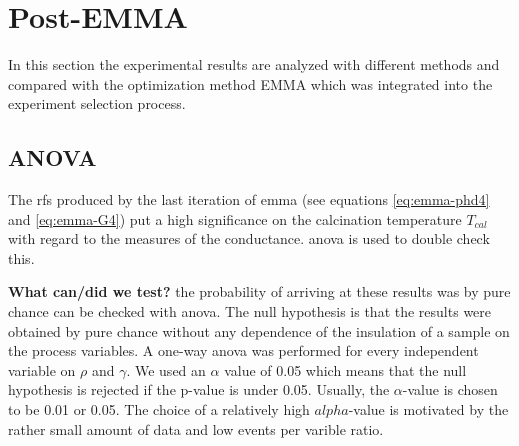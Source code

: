 \section{Post-EMMA}
\label{sec:res-post-emma}
In this section the experimental results are analyzed with different methods and compared 
with the optimization method EMMA which was integrated into the experiment selection process. 
\subsection{ANOVA}\label{sec:res-anova}
The \gls{rf}s produced by the last iteration of \gls{emma} (see equations \ref{eq:emma-phd4} and \ref{eq:emma-G4}) put a high significance
on the calcination temperature $T_{cal}$ with regard to the 
measures of the conductance. 
\Gls{anova} is used to double check this. 

\textbf{What can/did we test?}
the probability of arriving at these results was by pure chance can be checked with \gls{anova}. 
The null hypothesis is that the results were obtained by pure chance without any dependence of the insulation of a sample on the process variables.
A one-way \gls{anova} was performed for every independent variable on $\rho$ and $\gamma$. 
We used an $\alpha$ value of 0.05 which means that 
the null hypothesis is rejected if the p-value is under 0.05. 
Usually, the $\alpha$-value is chosen to be 0.01 or 0.05\cite{hoffman2020concept,sellke2001pvalues}.
The choice of a relatively high $alpha$-value is motivated by the rather small amount of data and low events per varible ratio.


